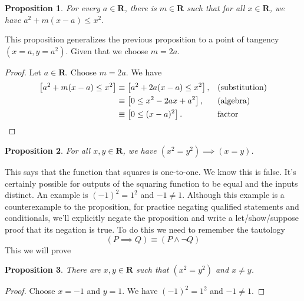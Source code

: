 \documentclass[12pt,fleqn,answers]{article}
\newcommand{\reals}{\mathbf{R}}
\newenvironment{myproof}
  {\begin{shaded}\begin{proof}}
  {\end{proof}\end{shaded}}
\newtheorem{prop}{Proposition}
\begin{document}
     \begin{prop} For every $a \in \reals$, there is $m \in \reals$ such 
     that for all $x \in \reals$, we have $a^2 + m(x-a) \leq x^2$.
     \end{prop}
     This proposition generalizes the previous proposition to a point of tangency $(x=a,y=a^2)$. Given that we choose $m=2a$. 

      \begin{myproof} 
      Let $a \in \reals$. Choose $m=2a$. We have
      \begin{align*}
       \left[{a^2+m(x-a) \le x^2} \right]   
       &\equiv \left[a^2+2a(x-a)\le x^2\right], &&\text{(substitution)}\\
      &\equiv \left[0 \le x^2-2ax+a^2\right], &&\text{(algebra)}\\
      &\equiv \left[0 \le (x-a)^2\right]. &&\text{factor}  \qedhere
      \end{align*}
  \end{myproof}

     \begin{prop} For all $x,y \in \reals$, we have $(x^2 = y^2) \implies (x=y)$. 
     \end{prop} 
    \noindent This says that the function that squares is one-to-one. We know this is false. It's certainly possible for outputs of 
    the squaring function to be equal and the inputs distinct. An example is $(-1)^2 = 1^2$ and $-1 \neq 1$. Although this example
    is a counterexample to the proposition, for  practice negating qualified statements and conditionals,  we'll explicitly negate the proposition and write a let/show/suppose  proof that its negation is true.
    To do this we need to remember the tautology
    \begin{equation*}
       \left(P \implies Q\right) \equiv \left(P \land \lnot Q\right)
 \end{equation*}
   This we will prove
    \begin{prop} There are $x,y \in \reals$ such that  $(x^2 = y^2)$ and $x\neq y$. 
     \end{prop} 
     
     \begin{myproof} Choose $x=-1$ and $y=1$. We have $(-1)^2 = 1^2$ and $-1 \neq 1$.      \end{myproof}
\end{document}
